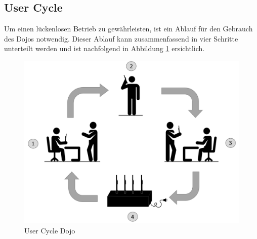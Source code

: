 \subsection{User Cycle}\label{sec:ladeablauf}

Um einen lückenlosen Betrieb zu gewährleisten, ist ein Ablauf für den Gebrauch des Dojos notwendig. Dieser Ablauf kann zusammenfassend in vier Schritte unterteilt werden und ist nachfolgend in Abbildung \ref{fig:Ladezyklus Dojo} ersichtlich.

\begin{figure}[H]
	\begin{center}
		\includegraphics[width=140mm]{data/Ladezyklus.png}
		\caption[User Cycle Dojo]{User Cycle Dojo} %
		\label{fig:Ladezyklus Dojo}
	\end{center}
\end{figure}


